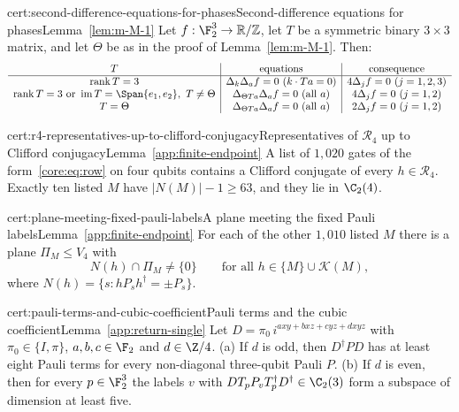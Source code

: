 \begin{finitefact}{cert:second-difference-equations-for-phases}{Second-difference equations for phases}{Lemma~\ref{lem:m-M-1}}
Let $f:\F_2^3\to\mathbb R/\mathbb Z$, let $T$ be a symmetric binary $3\times3$ matrix, and let $\Theta$ be as in the proof of Lemma~\ref{lem:m-M-1}. Then:
\[
\begin{array}{c|c|c}
T&\text{equations}&\text{consequence}\\\hline
\operatorname{rank}T=3&\Delta_k\Delta_af=0\ (k\cdot Ta=0)&4\Delta_jf=0\ (j=1,2,3)\\
\operatorname{rank}T=3\text{ or }\operatorname{im}T=\Span\{e_1,e_2\},\ T\ne\Theta&\Delta_{\Theta Ta}\Delta_af=0\ (\text{all }a)&4\Delta_jf=0\ (j=1,2)\\
T=\Theta&\Delta_{\Theta Ta}\Delta_af=0\ (\text{all }a)&2\Delta_jf=0\ (j=1,2)
\end{array}
\]
\end{finitefact}

\begin{finitefact}{cert:r4-representatives-up-to-clifford-conjugacy}{Representatives of $\mathscr R_4$ up to Clifford conjugacy}{Lemma~\ref{app:finite-endpoint}}
A list of $1{,}020$ gates of the form~\eqref{core:eq:row} on four qubits contains a Clifford conjugate of every $h\in\mathscr R_4$. Exactly ten listed $M$ have $|N(M)|-1\ge63$, and they lie in $\C_2(4)$.
\end{finitefact}

\begin{finitefact}{cert:plane-meeting-fixed-pauli-labels}{A plane meeting the fixed Pauli labels}{Lemma~\ref{app:finite-endpoint}}
For each of the other $1{,}010$ listed $M$ there is a plane $\Pi_M\le V_4$ with
\[
N(h)\cap\Pi_M\ne\{0\}\qquad\text{for all }h\in\{M\}\cup\mathcal K(M),
\]
where $N(h)=\{s:hP_sh^\dagger=\pm P_s\}$.
\end{finitefact}

\begin{finitefact}{cert:pauli-terms-and-cubic-coefficient}{Pauli terms and the cubic coefficient}{Lemma~\ref{app:return-single}}
Let $D=\pi_0\,i^{axy+bxz+cyz+dxyz}$ with $\pi_0\in\{I,\pi\}$, $a,b,c\in\F_2$ and $d\in\Z/4$. (a) If $d$ is odd, then $D^\dagger PD$ has at least eight Pauli terms for every non-diagonal three-qubit Pauli $P$. (b) If $d$ is even, then for every $p\in\F_2^3$ the labels $v$ with $DT_pP_vT_p^\dagger D^\dagger\in\C_2(3)$ form a subspace of dimension at least five.
\end{finitefact}

